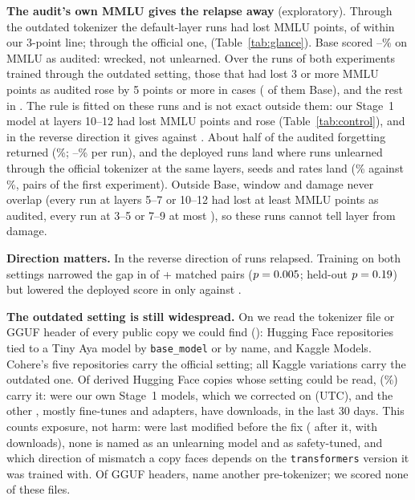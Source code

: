 \documentclass[11pt]{article}
\begin{document}
\textbf{The audit's own MMLU gives the relapse away} (exploratory). Through the outdated tokenizer the default-layer runs had lost \stwoDefaultCostAudited{} MMLU points, \stwoDefaultWithin{} of \stwoDefaultN{} within our 3-point line; through the official one, \stwoDefaultCostDeployed{} (Table~\ref{tab:glance}). Base scored \stwoBaseMmluLow--\stwoBaseMmluHigh\% on MMLU as audited: wrecked, not unlearned. Over the \dmgRuns{} runs of both experiments trained through the outdated setting, those that had lost 3 or more MMLU points as audited rose by 5 points or more in \dmgHurtRose{} cases (\dmgHurtBase{} of them Base), and the rest in \dmgFineRose. The rule is fitted on these runs and is not exact outside them: our Stage~1 model at layers 10--12 had lost \ctlDeepLost{} MMLU points and rose \ctlDeepRise{} (Table~\ref{tab:control}), and in the reverse direction it gives \revHurtRose{} against \revFineRose. About half of the audited forgetting returned (\stwoShareBack\%; \stwoShareLow--\stwoShareHigh\% per run), and the deployed runs land where runs unlearned through the official tokenizer at the same layers, seeds and rates land (\ctlOutdatedTrained\% against \ctlOfficialTrained\%, \ctlPairs{} pairs of the first experiment). Outside Base, window and damage never overlap (every run at layers 5--7 or 10--12 had lost at least \dmgHighMin{} MMLU points as audited, every run at 3--5 or 7--9 at most \dmgLowMax), so these runs cannot tell layer from damage.

\textbf{Direction matters.} In the reverse direction \shiftReverseRel{} of \shiftReverseEff{} runs relapsed. Training on both settings narrowed the gap in \shiftPthreeWins{} of \the\numexpr\shiftPthreeWins+\shiftPthreeLosses\relax{} matched pairs ($p=0.005$; held-out $p=0.19$) but lowered the deployed score in only \shiftPfourWins{} against \shiftPfourLosses.

\textbf{The outdated setting is still widespread.} On \surveyDate{} we read the tokenizer file or GGUF header of every public copy we could find (): \surveyFound{} Hugging Face repositories tied to a Tiny Aya model by \texttt{base\_model} or by name, and Kaggle Models. Cohere's five repositories carry the official setting; all \surveyKaggle{} Kaggle variations carry the outdated one. Of \surveyRead{} derived Hugging Face copies whose setting could be read, \surveyOutdated{} (\surveyShare\%) carry it: \surveyOurs{} were our own Stage~1 models, which we corrected on \fixDay{} (UTC), and the other \surveyOutdatedOthers{}, mostly fine-tunes and adapters, have \surveyDownloads{} downloads, \surveyDownloadsMonth{} in the last 30 days. This counts exposure, not harm: \surveyBeforeFix{} were last modified before the fix (\surveyAfterFix{} after it, with \surveyAfterFixDownloads{} downloads), none is named as an unlearning model and \surveySafety{} as safety-tuned, and which direction of mismatch a copy faces depends on the \texttt{transformers} version it was trained with. Of \surveyGguf{} GGUF headers, \surveyGgufOther{} name another pre-tokenizer; we scored none of these files.
\end{document}
